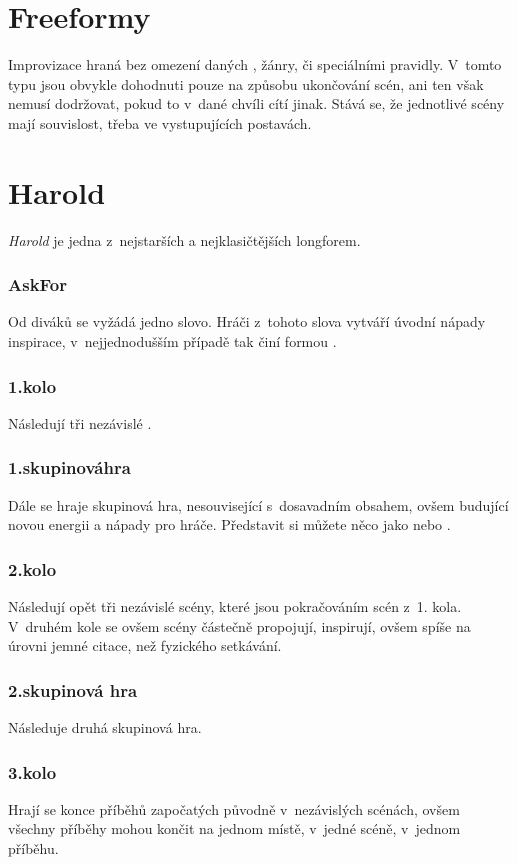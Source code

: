  
 
\needspace{5cm} \section{Freeformy} \label{freeformy} Improvizace hraná bez omezení daných , žánry, či speciálními pravidly. V~tomto typu   jsou  obvykle dohodnuti pouze na způsobu ukončování scén, ani ten však nemusí dodržovat, pokud to v~dané chvíli cítí jinak. Stává se, že jednotlivé scény mají souvislost, třeba ve vystupujících postavách. 
 
 
\needspace{5cm} \section{Harold} \label{harold} \textit{Harold} je jedna z~nejstarších a nejklasičtějších longforem. 
\subsubsection{AskFor} Od diváků se vyžádá jedno slovo.  Hráči z~tohoto slova vytváří úvodní nápady inspirace, v~nejjednodušším případě tak činí formou . 
\subsubsection{1.kolo} Následují tři nezávislé  . 
\subsubsection{1.skupinováhra} Dále se hraje skupinová hra, nesouvisející s~dosavadním obsahem,  ovšem budující novou energii a nápady pro hráče. Představit si můžete něco jako  nebo . 
\subsubsection{2.kolo} Následují opět tři nezávislé scény, které jsou pokračováním scén z~1. kola. 
V~druhém kole se ovšem scény částečně propojují, inspirují, ovšem spíše na úrovni jemné citace, než  fyzického setkávání.  
\subsubsection{2.skupinová hra} Následuje druhá skupinová hra. 
\subsubsection{3.kolo} Hrají se konce příběhů započatých původně v~nezávislých scénách, ovšem  všechny příběhy mohou končit na jednom místě, v~jedné scéně, v~jednom příběhu. 
 
